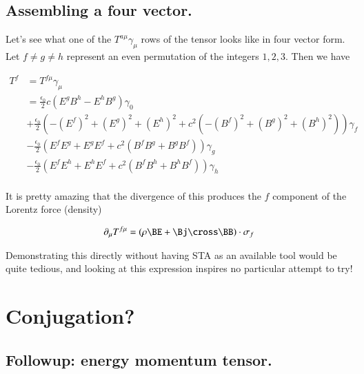 \subsection{Assembling a four vector. }

Let's see what one of the $T^{a\mu} \gamma_\mu$ rows of the tensor looks like in four vector form.  Let $f \ne g \ne h$ 
represent an even permutation of the integers $1,2,3$.  Then we have

\begin{align*}
T^f 
&= T^{f\mu} \gamma_\mu \\
&= 
\frac{\epsilon_0}{2} c (E^g B^h - E^h B^g) \gamma_0 \\
&+\frac{\epsilon_0}{2} \left( -(E^f)^2 +(E^g)^2 +(E^h)^2 + c^2 ( -(B^f)^2 +(B^g)^2 +(B^h)^2 ) \right) \gamma_f \\
&-\frac{\epsilon_0}{2} \left( E^f E^g + E^g E^f + c^2 (B^f B^g + B^g B^f) \right) \gamma_g \\
&-\frac{\epsilon_0}{2} \left( E^f E^h + E^h E^f + c^2 (B^f B^h + B^h B^f) \right) \gamma_h \\
\end{align*}

It is pretty amazing that the divergence of this produces the $f$ component of the Lorentz force (density)

\begin{align}
\partial_\mu T^{f\mu} = (\rho \BE + \Bj \cross \BB) \cdot \sigma_f
\end{align}

Demonstrating this directly without having STA as an available tool would be quite tedious, and looking at this
expression inspires no particular attempt to try!


%
%

\section{Conjugation? }
\subsection{Followup: energy momentum tensor. }

